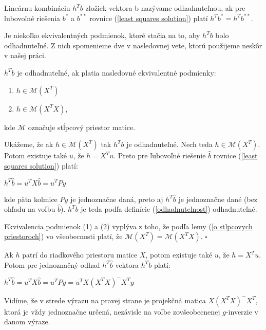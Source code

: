 \begin{defin}
\label{odhadnutelnost}
Lineárnu kombináciu $h^T b$ zložiek vektora b nazývame odhadnuteľnou,
ak pre ľubovoľné riešenia $b^*$ a $b^{**}$ rovnice (\ref{least squares solution}) platí $h^T b^* = h^T b^{**}$.
\end{defin}

Je niekoľko ekvivalentných podmienok, ktoré stačia na to, aby $h^T b$ bolo odhadnuteľné. 
Z nich spomenieme dve v nasledovnej vete, ktorú použijeme neskôr v našej práci.

\begin{theorem}
\label{veta1}
$h^T b$ je odhadnuteľné, ak platia nasledovné ekvivalentné podmienky:
\begin{enumerate}
  \item $h \in \mathcal{M}(X^T)$
  \item $h \in \mathcal{M}(X^T X)$,
\end{enumerate}
kde $\mathcal{M}$ označuje stĺpcový priestor matice.
\end{theorem}

\begin{dokaz}
Ukážeme, že ak $h \in \mathcal{M}(X^T)$ tak $h^T b$ je odhadnuteľné.
Nech teda $h \in \mathcal{M}(X^T)$. Potom existuje také $u$, že $h = X^T u$.
Preto pre ľubovoľné riešenie $\hat{b}$ rovnice (\ref{least squares solution}) platí:

\begin{center}
$
h^T \hat{b} = u^T X \hat{b} = u^T P y
$
\end{center}

kde päta kolmice $Py$ je jednoznačne daná, preto aj $h^T \hat{b}$ je jednoznačne dané (bez ohľadu na voľbu $\hat{b}$).
$h^T b$ je teda podľa definície (\ref{odhadnutelnost}) odhadnuteľné.

Ekvivalencia podmienok (1) a (2) vyplýva z toho, že podľa lemy (\ref{o stlpcovych priestoroch}) vo všeobecnosti platí, že $\mathcal{M}(X^T) = \mathcal{M}(X^T X)$.
$\square$
\end{dokaz}

Ak $h$ patrí do riadkového priestoru matice $X$, potom existuje také $u$, že $h = X^T u$.
Potom pre jednoznačný odhad $h^T \hat{b}$ vektora $h^T b$ platí:

\begin{center}
$h^T \hat{b} = u^T X \hat{b} = u^T P y = u^T X(X^T X)^- X^T y$
\end{center}

Vidíme, že v strede výrazu na pravej strane je projekčná matica $X(X^T X)^- X^T$, ktorá je vždy jednoznačne určená, 
nezávisle na voľbe zovšeobecnenej $g$-inverzie v danom výraze.

